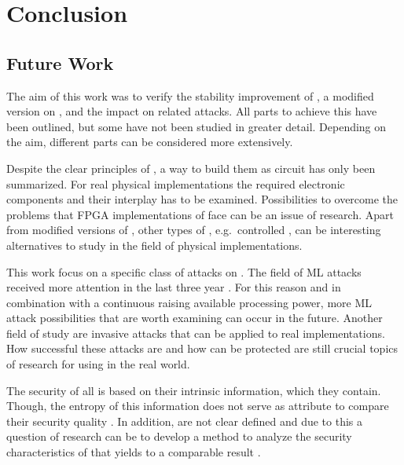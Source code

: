 \chapter{Conclusion}
\label{cap:conclusion}

\section{Future Work}

The aim of this work was to verify the stability improvement of \mpufs, a modified version on \apufs, and the impact on related attacks.
All parts to achieve this have been outlined, but some have not been studied in greater detail.
Depending on the aim, different parts can be considered more extensively.

Despite the clear principles of \apufs, a way to build them as circuit has only been summarized.
For real physical implementations the required electronic components and their interplay has to be examined.
Possibilities to overcome the problems that \ac{FPGA} implementations of \apufs face can be an issue of research.
Apart from modified versions of \apufs, other types of \pufs, e.g.\ controlled \pufs, can be interesting alternatives to study in the field of physical implementations.

This work focus on a specific class of attacks on \pufs.
The field of \ac{ML} attacks received more attention in the last three year \cite{Google2017MachineTrends}.
For this reason and in combination with a continuous raising available processing power, more \ac{ML} attack possibilities that are worth examining can occur in the future.
Another field of study are invasive attacks that can be applied to real \puf implementations.
How successful these attacks are and how \pufs can be protected are still crucial topics of research for using \pufs in the real world.

The security of all \pufs is based on their intrinsic information, which they contain.
Though, the entropy of this information does not serve as attribute to compare their security quality \cite{Ruhrmair2010ModelingFunctions}.
In addition, \pufs are not clear defined and due to this a question of research can be to develop a method to analyze the security characteristics of \pufs that yields to a comparable result \cite{Becker2015ThePUFs}.

